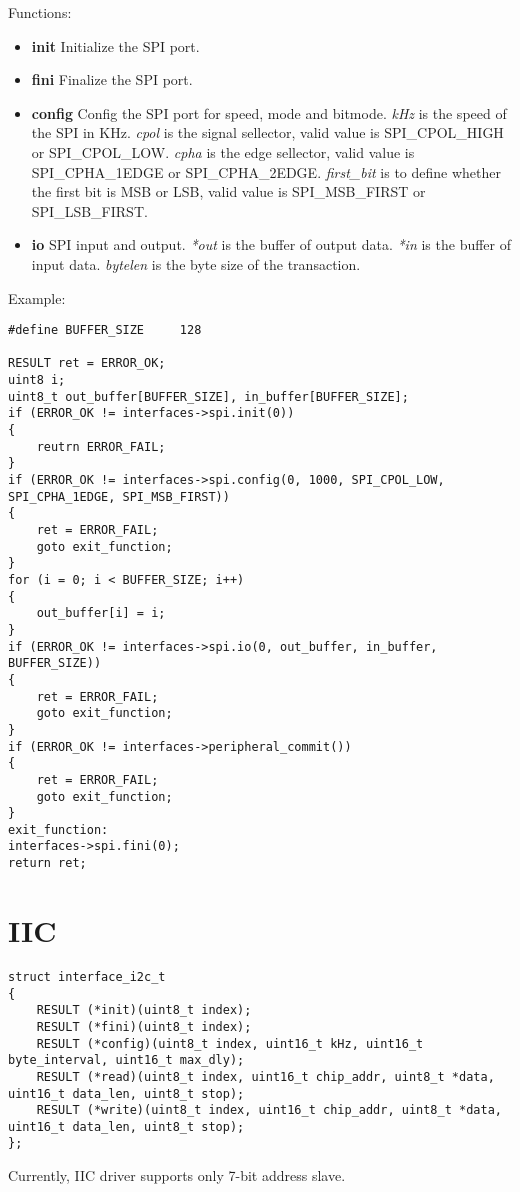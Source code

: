 \documentclass[a4paper,12pt]{book}
\begin{document}
\vspace{6pt}
Functions:
\begin{itemize}
\item \textbf{init}
Initialize the SPI port.
\item \textbf{fini}
Finalize the SPI port.
\item \textbf{config}
Config the SPI port for speed, mode and bitmode.
\newline\emph{kHz} is the speed of the SPI in KHz.
\newline\emph{cpol} is the signal sellector, valid value is SPI\_CPOL\_HIGH or SPI\_CPOL\_LOW.
\newline\emph{cpha} is the edge sellector, valid value is SPI\_CPHA\_1EDGE or SPI\_CPHA\_2EDGE.
\newline\emph{first\_bit} is to define whether the first bit is MSB or LSB, valid value is SPI\_MSB\_FIRST or SPI\_LSB\_FIRST.
\item \textbf{io}
SPI input and output.
\newline\emph{*out} is the buffer of output data.
\newline\emph{*in} is the buffer of input data.
\newline\emph{bytelen} is the byte size of the transaction.
\end{itemize}

\vspace{6pt}
Example:
\begin{lstlisting}
#define BUFFER_SIZE		128

RESULT ret = ERROR_OK;
uint8 i;
uint8_t out_buffer[BUFFER_SIZE], in_buffer[BUFFER_SIZE];
if (ERROR_OK != interfaces->spi.init(0))
{
	reutrn ERROR_FAIL;
}
if (ERROR_OK != interfaces->spi.config(0, 1000, SPI_CPOL_LOW, SPI_CPHA_1EDGE, SPI_MSB_FIRST))
{
	ret = ERROR_FAIL;
	goto exit_function;
}
for (i = 0; i < BUFFER_SIZE; i++)
{
	out_buffer[i] = i;
}
if (ERROR_OK != interfaces->spi.io(0, out_buffer, in_buffer, BUFFER_SIZE))
{
	ret = ERROR_FAIL;
	goto exit_function;
}
if (ERROR_OK != interfaces->peripheral_commit())
{
	ret = ERROR_FAIL;
	goto exit_function;
}
exit_function:
interfaces->spi.fini(0);
return ret;
\end{lstlisting}

\newpage
\section{IIC}
\begin{lstlisting}
struct interface_i2c_t
{
	RESULT (*init)(uint8_t index);
	RESULT (*fini)(uint8_t index);
	RESULT (*config)(uint8_t index, uint16_t kHz, uint16_t byte_interval, uint16_t max_dly);
	RESULT (*read)(uint8_t index, uint16_t chip_addr, uint8_t *data, uint16_t data_len, uint8_t stop);
	RESULT (*write)(uint8_t index, uint16_t chip_addr, uint8_t *data, uint16_t data_len, uint8_t stop);
};
\end{lstlisting}
Currently, IIC driver supports only 7-bit address slave.
\end{document}
